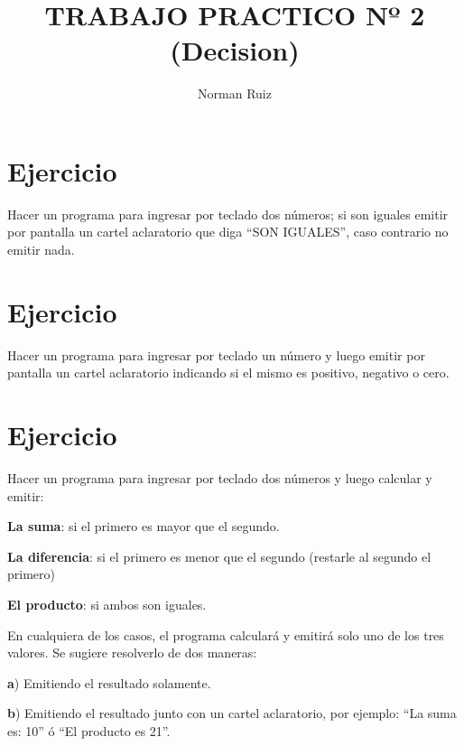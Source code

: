 \documentclass[12pt,a4paper,twoside]{article}
\author{Norman Ruiz}
\title{TRABAJO PRACTICO \linebreak Nº 2 \linebreak (Decision)}
\begin{document}
\maketitle
\newpage

\tableofcontents
\newpage

\section{Ejercicio }

\hspace*{1cm}Hacer un programa para ingresar por teclado dos números; si son iguales emitir por
pantalla un cartel aclaratorio que diga “SON IGUALES”, caso contrario no emitir nada.

\newpage

\section{Ejercicio }

\hspace*{1cm}Hacer un programa para ingresar por teclado un número y luego emitir por pantalla un
cartel aclaratorio indicando si el mismo es positivo, negativo o cero.

\newpage

\section{Ejercicio }

\hspace*{1cm}Hacer un programa para ingresar por teclado dos números y luego calcular y emitir:
\begin{list}{•}{}
\item \textbf{La suma}: si el primero es mayor que el segundo.
\item \textbf{La diferencia}: si el primero es menor que el segundo (restarle al segundo el primero)
\item \textbf{El producto}: si ambos son iguales.
\end{list}
En cualquiera de los casos, el programa calculará y emitirá solo uno de los tres valores.
Se sugiere resolverlo de dos maneras:
\begin{list}{•}{}
\item \textbf{a}) Emitiendo el resultado solamente.
\item \textbf{b}) Emitiendo el resultado junto con un cartel aclaratorio, por ejemplo: “La suma es: 10” ó “El producto es 21”.
\end{list}
\end{document}
